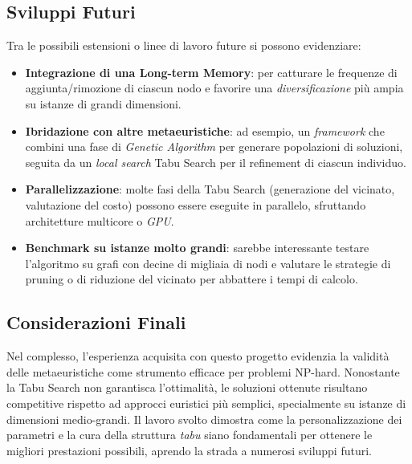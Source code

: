 \subsection*{Sviluppi Futuri}
Tra le possibili estensioni o linee di lavoro future si possono evidenziare:
\begin{itemize}
    \item \textbf{Integrazione di una Long-term Memory}: per catturare le frequenze di aggiunta/rimozione di ciascun nodo e favorire una \emph{diversificazione} più ampia su istanze di grandi dimensioni.
    \item \textbf{Ibridazione con altre metaeuristiche}: ad esempio, un \emph{framework} che combini una fase di \emph{Genetic Algorithm} per generare popolazioni di soluzioni, seguita da un \emph{local search} Tabu Search per il refinement di ciascun individuo.
    \item \textbf{Parallelizzazione}: molte fasi della Tabu Search (generazione del vicinato, valutazione del costo) possono essere eseguite in parallelo, sfruttando architetture multicore o \emph{GPU}.
    \item \textbf{Benchmark su istanze molto grandi}: sarebbe interessante testare l’algoritmo su grafi con decine di migliaia di nodi e valutare le strategie di pruning o di riduzione del vicinato per abbattere i tempi di calcolo.
\end{itemize}

\subsection*{Considerazioni Finali}
Nel complesso, l’esperienza acquisita con questo progetto evidenzia la validità delle metaeuristiche come strumento efficace per problemi NP-hard. Nonostante la Tabu Search non garantisca l’ottimalità, le soluzioni ottenute risultano competitive rispetto ad approcci euristici più semplici, specialmente su istanze di dimensioni medio-grandi. Il lavoro svolto dimostra come la personalizzazione dei parametri e la cura della struttura \emph{tabu} siano fondamentali per ottenere le migliori prestazioni possibili, aprendo la strada a numerosi sviluppi futuri.

